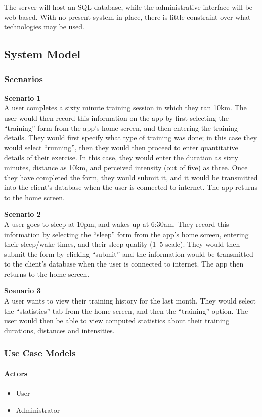 \documentclass[a4paper, 11pt, titlepage]{article}
\begin{document}
The server will host an SQL database, while the administrative interface will be web based. With no present system in place, there is little constraint over what technologies may be used.

\subsection{System Model}
\subsubsection{Scenarios}
\textbf{Scenario 1}\\[0pt]
A user completes a sixty minute training session in which they ran 10km. The user would then record this information on the app by first selecting the “training” form from the app’s home screen, and then entering the training details. They would first specify what type of training was done; in this case they would select “running”, then they would then proceed to enter quantitative details of their exercise. In this case, they would enter the duration as sixty minutes, distance as 10km, and perceived intensity (out of five) as three. Once they have completed the form, they would submit it, and it would be transmitted into the client’s database when the user is connected to internet. The app returns to the home screen.

\textbf{Scenario 2}\\[0pt]
A user goes to sleep at 10pm, and wakes up at 6:30am. They record this information by selecting the “sleep” form from the app’s home screen, entering their sleep/wake times, and their sleep quality (1--5 scale).  They would then submit the form by clicking “submit” and the information would be transmitted to the client’s database when the user is connected to internet. The app then returns to the home screen.

\textbf{Scenario 3}\\[0pt]
A user wants to view their training history for the last month. They would select the “statistics” tab from the home screen, and then the “training” option. The user would then be able to view computed statistics about their training durations, distances and intensities.


\subsubsection{Use Case Models}
\paragraph{Actors}
\begin{itemize}
	\item User
	\item Administrator
\end{itemize}
\end{document}
